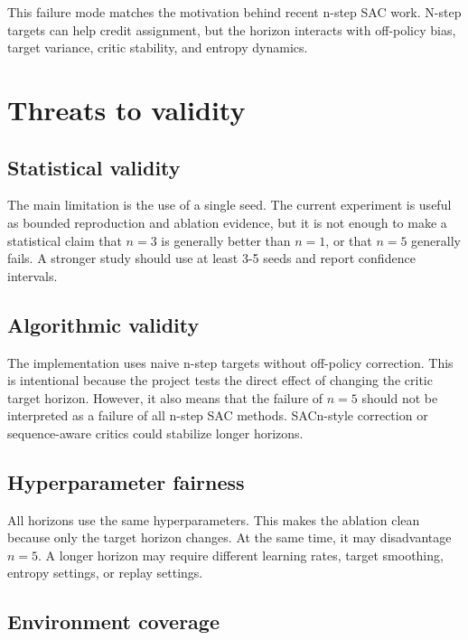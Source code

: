 \documentclass[
  american,
]{article}
\begin{document}
This failure mode matches the motivation behind recent n-step SAC work.
N-step targets can help credit assignment, but the horizon interacts
with off-policy bias, target variance, critic stability, and entropy
dynamics.

\section{Threats to validity}\label{threats-to-validity}

\subsection{Statistical validity}\label{statistical-validity}

The main limitation is the use of a single seed. The current experiment
is useful as bounded reproduction and ablation evidence, but it is not
enough to make a statistical claim that \(n=3\) is generally better than
\(n=1\), or that \(n=5\) generally fails. A stronger study should use at
least 3-5 seeds and report confidence intervals.

\subsection{Algorithmic validity}\label{algorithmic-validity}

The implementation uses naive n-step targets without off-policy
correction. This is intentional because the project tests the direct
effect of changing the critic target horizon. However, it also means
that the failure of \(n=5\) should not be interpreted as a failure of
all n-step SAC methods. SACn-style correction or sequence-aware critics
could stabilize longer horizons.

\subsection{Hyperparameter fairness}\label{hyperparameter-fairness}

All horizons use the same hyperparameters. This makes the ablation clean
because only the target horizon changes. At the same time, it may
disadvantage \(n=5\). A longer horizon may require different learning
rates, target smoothing, entropy settings, or replay settings.

\subsection{Environment coverage}\label{environment-coverage}
\end{document}
